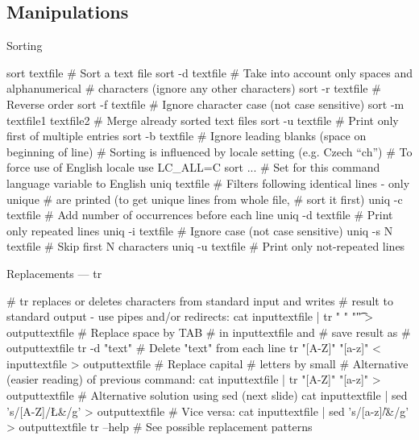 \documentclass[compress, ucs, xelatex, 11pt, xcolor=svgnames,
  hyperref={
    bookmarks=true,
    unicode=true,
    colorlinks=true,
    pdftitle={Linux, command line and MetaCentrum},
    plainpages=false,
    pdfauthor={Vojtech Zeisek},
    pdfsubject={Course about use of Linux command line, writing shell scripts and using MetaCentrum of CESNET},
    pdfcreator={XeLaTeX, http://www.xelatex.org/},
    pdfkeywords={Linux, GNU, BASH, shell, command line, MetaCentrum},
    linkcolor=Sienna,
    anchorcolor=black,
    citecolor=green,
    filecolor=magenta,
    menucolor=Sienna,
    urlcolor=cyan,
    pdftex},
  url={hyphens, lowtilde} %
  ]{beamer}
\begin{document}
\subsection{Manipulations}

\begin{frame}[fragile]{Sorting}
  \begin{bashcode}
    sort textfile # Sort a text file
    sort -d textfile # Take into account only spaces and alphanumerical
                     # characters (ignore any other characters)
    sort -r textfile # Reverse order
    sort -f textfile # Ignore character case (not case sensitive)
    sort -m textfile1 textfile2 # Merge already sorted text files
    sort -u textfile # Print only first of multiple entries
    sort -b textfile # Ignore leading blanks (space on beginning of line)
    # Sorting is influenced by locale setting (e.g. Czech ``ch'')
    # To force use of English locale use
    LC_ALL=C sort ... # Set for this command language variable to English
    uniq textfile # Filters following identical lines - only unique
                  # are printed (to get unique lines from whole file,
                  # sort it first)
    uniq -c textfile # Add number of occurrences before each line
    uniq -d textfile # Print only repeated lines
    uniq -i textfile # Ignore case (not case sensitive)
    uniq -s N textfile # Skip first N characters
    uniq -u textfile # Print only not-repeated lines
  \end{bashcode}
\end{frame}

\begin{frame}[fragile]{Replacements --- tr}
  \begin{bashcode}
    # tr replaces or deletes characters from standard input and writes
    # result to standard output - use pipes and/or redirects:
    cat inputtextfile | tr " " "\t" > outputtextfile # Replace space by TAB
                                                     # in inputtextfile and
                                                     # save result as
                                                     # outputtextfile
    tr -d "text" # Delete "text" from each line
    tr "[A-Z]" "[a-z]" < inputtextfile > outputtextfile # Replace capital
                                                        # letters by small
    # Alternative (easier reading) of previous command:
    cat inputtextfile | tr "[A-Z]" "[a-z]" > outputtextfile
    # Alternative solution using sed (next slide)
    cat inputtextfile | sed 's/[A-Z]/\L&/g' > outputtextfile # Vice versa:
    cat inputtextfile | sed 's/[a-z]/\U&/g' > outputtextfile
    tr --help # See possible replacement patterns
  \end{bashcode}
\end{frame}
\end{document}

